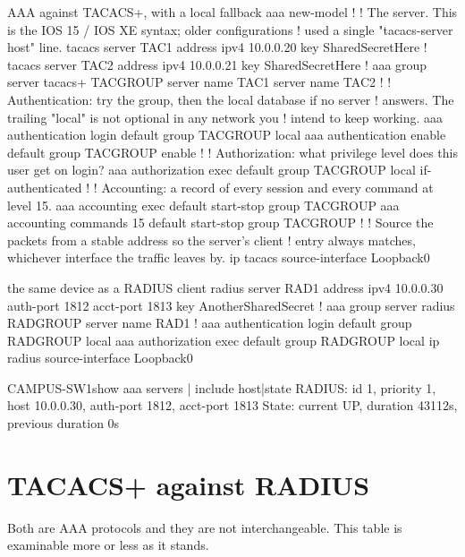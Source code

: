 \begin{config}{AAA against TACACS+, with a local fallback}
aaa new-model
!
! The server. This is the IOS 15 / IOS XE syntax; older configurations
! used a single "tacacs-server host" line.
tacacs server TAC1
 address ipv4 10.0.0.20
 key SharedSecretHere
!
tacacs server TAC2
 address ipv4 10.0.0.21
 key SharedSecretHere
!
aaa group server tacacs+ TACGROUP
 server name TAC1
 server name TAC2
!
! Authentication: try the group, then the local database if no server
! answers. The trailing "local" is not optional in any network you
! intend to keep working.
aaa authentication login default group TACGROUP local
aaa authentication enable default group TACGROUP enable
!
! Authorization: what privilege level does this user get on login?
aaa authorization exec default group TACGROUP local if-authenticated
!
! Accounting: a record of every session and every command at level 15.
aaa accounting exec default start-stop group TACGROUP
aaa accounting commands 15 default start-stop group TACGROUP
!
! Source the packets from a stable address so the server's client
! entry always matches, whichever interface the traffic leaves by.
ip tacacs source-interface Loopback0
\end{config}

\begin{config}{the same device as a RADIUS client}
radius server RAD1
 address ipv4 10.0.0.30 auth-port 1812 acct-port 1813
 key AnotherSharedSecret
!
aaa group server radius RADGROUP
 server name RAD1
!
aaa authentication login default group RADGROUP local
aaa authorization exec default group RADGROUP local
ip radius source-interface Loopback0
\end{config}

\begin{verify}{CAMPUS-SW1}{show aaa servers | include host|state}
RADIUS: id 1, priority 1, host 10.0.0.30, auth-port 1812, acct-port 1813
     State: current UP, duration 43112s, previous duration 0s
\end{verify}

\section{TACACS+ against RADIUS}

Both are AAA protocols and they are not interchangeable. This table is
examinable more or less as it stands.

